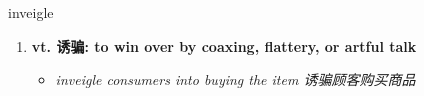 
\begin{frame}
{\huge inveigle}
\begin{center}
\begin{enumerate}\Large
  \item \textbf{vt. 诱骗: to win over by coaxing, flattery, or artful talk}
  \begin{itemize}
    \item \em{\Large{inveigle consumers into buying the item 诱骗顾客购买商品}}
  \end{itemize}
\end{enumerate}
\end{center}
\end{frame}
